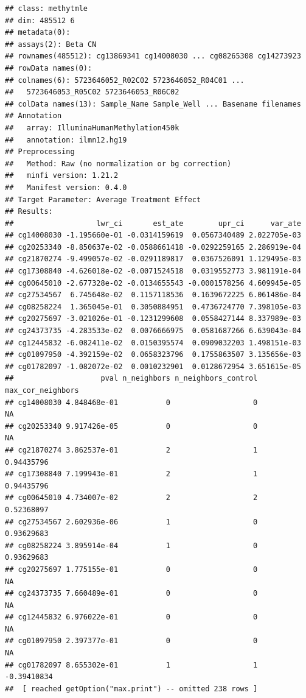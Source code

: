 \documentclass[9pt,a4paper,]{extarticle}
\theoremstyle{definition}
\theoremstyle{definition}
\theoremstyle{definition}
\theoremstyle{remark}
\begin{document}
\begin{verbatim}
## class: methytmle 
## dim: 485512 6 
## metadata(0):
## assays(2): Beta CN
## rownames(485512): cg13869341 cg14008030 ... cg08265308 cg14273923
## rowData names(0):
## colnames(6): 5723646052_R02C02 5723646052_R04C01 ...
##   5723646053_R05C02 5723646053_R06C02
## colData names(13): Sample_Name Sample_Well ... Basename filenames
## Annotation
##   array: IlluminaHumanMethylation450k
##   annotation: ilmn12.hg19
## Preprocessing
##   Method: Raw (no normalization or bg correction)
##   minfi version: 1.21.2
##   Manifest version: 0.4.0
## Target Parameter: Average Treatment Effect
## Results: 
##                   lwr_ci       est_ate        upr_ci      var_ate
## cg14008030 -1.195660e-01 -0.0314159619  0.0567340489 2.022705e-03
## cg20253340 -8.850637e-02 -0.0588661418 -0.0292259165 2.286919e-04
## cg21870274 -9.499057e-02 -0.0291189817  0.0367526091 1.129495e-03
## cg17308840 -4.626018e-02 -0.0071524518  0.0319552773 3.981191e-04
## cg00645010 -2.677328e-02 -0.0134655543 -0.0001578256 4.609945e-05
## cg27534567  6.745648e-02  0.1157118536  0.1639672225 6.061486e-04
## cg08258224  1.365045e-01  0.3050884951  0.4736724770 7.398105e-03
## cg20275697 -3.021026e-01 -0.1231299608  0.0558427144 8.337989e-03
## cg24373735 -4.283533e-02  0.0076666975  0.0581687266 6.639043e-04
## cg12445832 -6.082411e-02  0.0150395574  0.0909032203 1.498151e-03
## cg01097950 -4.392159e-02  0.0658323796  0.1755863507 3.135656e-03
## cg01782097 -1.082072e-02  0.0010232901  0.0128672954 3.651615e-05
##                    pval n_neighbors n_neighbors_control max_cor_neighbors
## cg14008030 4.848468e-01           0                   0                NA
## cg20253340 9.917426e-05           0                   0                NA
## cg21870274 3.862537e-01           2                   1        0.94435796
## cg17308840 7.199943e-01           2                   1        0.94435796
## cg00645010 4.734007e-02           2                   2        0.52368097
## cg27534567 2.602936e-06           1                   0        0.93629683
## cg08258224 3.895914e-04           1                   0        0.93629683
## cg20275697 1.775155e-01           0                   0                NA
## cg24373735 7.660489e-01           0                   0                NA
## cg12445832 6.976022e-01           0                   0                NA
## cg01097950 2.397377e-01           0                   0                NA
## cg01782097 8.655302e-01           1                   1       -0.39410834
##  [ reached getOption("max.print") -- omitted 238 rows ]
\end{verbatim}
\end{document}
